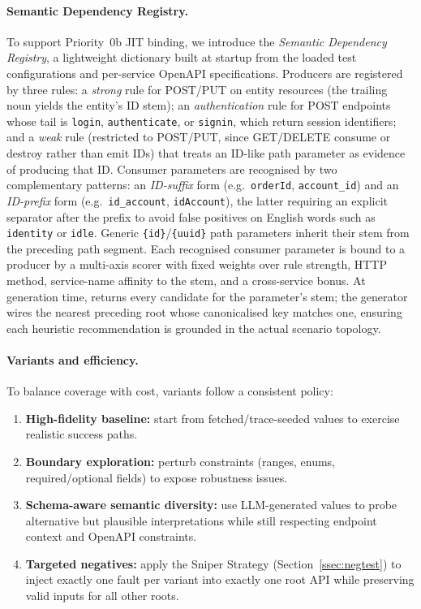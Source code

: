 \documentclass[conference]{IEEEtran}
\begin{document}
\paragraph{Semantic Dependency Registry.}
To support Priority~0b JIT binding, we introduce the \emph{Semantic Dependency Registry}, a lightweight dictionary built at startup from the loaded test configurations and per-service OpenAPI specifications. Producers are registered by three rules: a \emph{strong} rule for POST/PUT on entity resources (the trailing noun yields the entity's ID stem); an \emph{authentication} rule for POST endpoints whose tail is \texttt{login}, \texttt{authenticate}, or \texttt{signin}, which return session identifiers; and a \emph{weak} rule (restricted to POST/PUT, since GET/DELETE consume or destroy rather than emit IDs) that treats an ID-like path parameter as evidence of producing that ID. Consumer parameters are recognised by two complementary patterns: an \emph{ID-suffix} form (e.g.\ \texttt{orderId}, \texttt{account\_id}) and an \emph{ID-prefix} form (e.g.\ \texttt{id\_account}, \texttt{idAccount}), the latter requiring an explicit separator after the prefix to avoid false positives on English words such as \texttt{identity} or \texttt{idle}. Generic \texttt{\{id\}}/\texttt{\{uuid\}} path parameters inherit their stem from the preceding path segment. Each recognised consumer parameter is bound to a producer by a multi-axis scorer with fixed weights over rule strength, HTTP method, service-name affinity to the stem, and a cross-service bonus. At generation time,  returns every candidate for the parameter's stem; the generator wires the nearest preceding root whose canonicalised key matches one, ensuring each heuristic recommendation is grounded in the actual scenario topology.

\paragraph{Variants and efficiency.}
To balance coverage with cost, variants follow a consistent policy:
\begin{enumerate}[leftmargin=*]
  \item \textbf{High-fidelity baseline:} start from fetched/trace-seeded values to exercise realistic success paths.
  \item \textbf{Boundary exploration:} perturb constraints (ranges, enums, required/optional fields) to expose robustness issues.
  \item \textbf{Schema-aware semantic diversity:} use LLM-generated values to probe alternative but plausible interpretations while still respecting endpoint context and OpenAPI constraints.
  \item \textbf{Targeted negatives:} apply the Sniper Strategy (Section~\ref{ssec:negtest}) to inject exactly one fault per variant into exactly one root API while preserving valid inputs for all other roots.
\end{enumerate}
\end{document}
